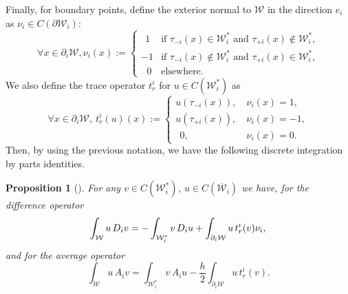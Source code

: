 \documentclass{amsart}
\numberwithin{equation}{section}
\newtheorem{proposition}[theorem]{Proposition}
\begin{document}
Finally, for boundary points, define the exterior normal to $\mathcal{W}$ in the direction $e_{i}$ as $\nu_{i}\in C(\partial\mathcal{W}_{i})$:
\begin{equation}
    \forall x\in\partial_{i}\mathcal{W}, \nu_{i}(x):= \begin{cases} \ \ 1 &  \mbox{if }\tau_{-i}(x)\in \mathcal{W}_{i}^{\ast} \mbox{ and }\tau_{+i}(x)\notin\mathcal{W}_{i}^{\ast},\\ 
    -1 &  \mbox{if }\tau_{-i}(x)\notin \mathcal{W}_{i}^{\ast} \mbox{ and }\tau_{+i}(x)\in\mathcal{W}_{i}^{\ast},\\ 
    \ \ \,0 &  \mbox{elsewhere}.
    \end{cases}
\end{equation}
 We also define the trace operator $t_{r}^{i}$ for $u\in C(\mathcal{W}^{\ast}_{i})$ as
\begin{equation}
    \forall x\in \partial_{i}\mathcal{W},\ t_{r}^{i}(u)(x):= \begin{cases}
    u(\tau_{-i}(x)),\ & \nu_{i}(x)=1,\\
    u(\tau_{+i}(x)),& \nu_{i}(x)=-1,\\
     \ \ 0, & \nu_{i}(x)=0.\end{cases}
\end{equation}
Then, by using the previous notation, we have the following discrete integration by parts identities.
\begin{proposition}[{\cite[Lemma 2.2]{LOPD:2023}}]\label{prop:integralbyparts}
For any $v\in C(\mathcal{W}_{i}^{\ast})$, $u\in C(\overline{\mathcal{W}}_{i})$ we have, for the difference operator
\begin{equation}\label{eq:int:dif}
    \int_{\mathcal{W}}u\,D_{i}v=-\int_{\mathcal{W}_{i}^{\ast}}v\,D_{i}u+\int_{\partial_{i}\mathcal{W}}u\,t_{r}^{i}(v)\nu_{i},\\
\end{equation}    
and for the average operator
\begin{equation}\label{eq:int:ave}
    \int_{\mathcal{W}}u\,A_{i}v=\int_{\mathcal{W}_{i}^{\ast}}v\,A_{i}u-\frac{h}{2}\int_{\partial_{i} \mathcal{W}}u\,t_{r}^{i}(v).
\end{equation}
\end{proposition}


\end{document}
